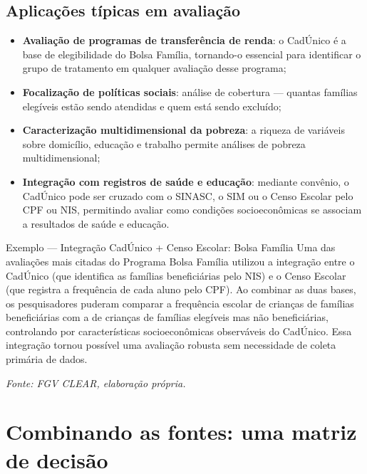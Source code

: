 \subsection{Aplicações típicas em avaliação}

\begin{itemize}
  \item \textbf{Avaliação de programas de transferência de renda}: o CadÚnico é a base de elegibilidade do Bolsa Família, tornando-o essencial para identificar o grupo de tratamento em qualquer avaliação desse programa;
  \item \textbf{Focalização de políticas sociais}: análise de cobertura — quantas famílias elegíveis estão sendo atendidas e quem está sendo excluído;
  \item \textbf{Caracterização multidimensional da pobreza}: a riqueza de variáveis sobre domicílio, educação e trabalho permite análises de pobreza multidimensional;
  \item \textbf{Integração com registros de saúde e educação}: mediante convênio, o CadÚnico pode ser cruzado com o SINASC, o SIM ou o Censo Escolar pelo CPF ou NIS, permitindo avaliar como condições socioeconômicas se associam a resultados de saúde e educação.
\end{itemize}

\begin{boxexemplo}{Exemplo — Integração CadÚnico + Censo Escolar: Bolsa Família}
Uma das avaliações mais citadas do Programa Bolsa Família utilizou a integração entre o CadÚnico (que identifica as famílias beneficiárias pelo NIS) e o Censo Escolar (que registra a frequência de cada aluno pelo CPF). Ao combinar as duas bases, os pesquisadores puderam comparar a frequência escolar de crianças de famílias beneficiárias com a de crianças de famílias elegíveis mas não beneficiárias, controlando por características socioeconômicas observáveis do CadÚnico. Essa integração tornou possível uma avaliação robusta sem necessidade de coleta primária de dados.

\textit{Fonte: FGV CLEAR, elaboração própria.}
\end{boxexemplo}

\section{Combinando as fontes: uma matriz de decisão}

